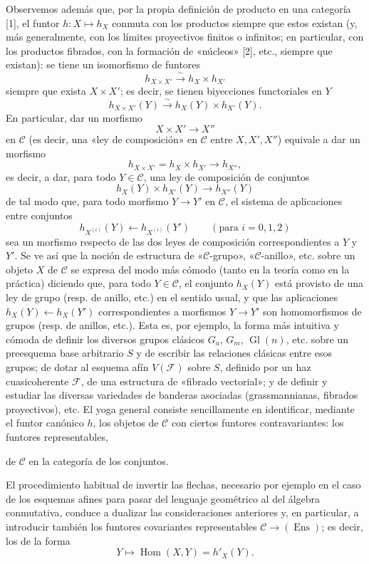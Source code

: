 \documentclass[11pt,twoside,openany]{book}
\numberwithin{equation}{section}
\newcommand{\src}[1]{%
  \phantomsection\hypertarget{src:#1}{}%
  \marginpar{\raggedleft\footnotesize\sffamily #1}%
}
\theoremstyle{plain}
\theoremstyle{definition}
\theoremstyle{remark}
\newcommand{\FgaUnitKey}{frontmatter}
\renewcommand{\src}[1]{%
  \phantomsection\hypertarget{src:\FgaUnitKey:#1}{}%
  \marginpar{\raggedleft\footnotesize\sffamily #1}%
}
\theoremstyle{plain}
\theoremstyle{definition}
\theoremstyle{remark}
\begin{document}
\src{370}
Observemos además que, por la propia definición de producto en una categoría
[1], el funtor $h:X\longmapsto h_X$ conmuta con los productos siempre que estos
existan (y, más generalmente, con los límites proyectivos finitos o infinitos;
en particular, con los productos fibrados, con la formación de «núcleos» [2],
etc., siempre que existan): se tiene un isomorfismo de funtores
\[
  h_{X\times X'}\xrightarrow{\sim}h_X\times h_{X'}
\]
siempre que exista $X\times X'$; es decir, se tienen biyecciones functoriales
en $Y$
\[
  h_{X\times X'}(Y)\xrightarrow{\sim}h_X(Y)\times h_{X'}(Y).
\]
En particular, dar un morfismo
\[
  X\times X'\longrightarrow X''
\]
en $\mathcal C$ (es decir, una «ley de composición» en $\mathcal C$ entre
$X,X',X''$) equivale a dar un morfismo
\[
  h_{X\times X'}=h_X\times h_{X'}\longrightarrow h_{X''},
\]
es decir, a dar, para todo $Y\in\mathcal C$, una ley de composición de
conjuntos
\[
  h_X(Y)\times h_{X'}(Y)\longrightarrow h_{X''}(Y)
\]
de tal modo que, para todo morfismo $Y\longrightarrow Y'$ en $\mathcal C$, el
sistema de aplicaciones entre conjuntos
\[
  h_{X^{(i)}}(Y)\longleftarrow h_{X^{(i)}}(Y')
  \qquad(\text{para }i=0,1,2)
\]
sea un morfismo respecto de las dos leyes de composición correspondientes a
$Y$ y $Y'$. Se ve así que la noción de estructura de «$\mathcal C$-grupo»,
«$\mathcal C$-anillo», etc. sobre un objeto $X$ de $\mathcal C$ se expresa del
modo más cómodo (tanto en la teoría como en la práctica) diciendo que, para
todo $Y\in\mathcal C$, el conjunto $h_X(Y)$ está provisto de una ley de grupo
(resp. de anillo, etc.) en el sentido usual, y que las aplicaciones
$h_X(Y)\longleftarrow h_X(Y')$ correspondientes a morfismos
$Y\longrightarrow Y'$ son homomorfismos de grupos (resp. de anillos, etc.).
Esta es, por ejemplo, la forma más intuitiva y cómoda de definir los diversos
grupos clásicos $G_a$, $G_m$, $\operatorname{Gl}(n)$, etc. sobre un preesquema
base arbitrario $S$ y de escribir las relaciones clásicas entre esos grupos;
de dotar al esquema afín $V(\mathcal F)$ sobre $S$, definido por un haz
cuasicoherente $\mathcal F$, de una estructura de «fibrado vectorial»; y de
definir y estudiar las diversas variedades de banderas asociadas
(grassmannianas, fibrados proyectivos), etc. El yoga general consiste
sencillamente en identificar, mediante el funtor canónico $h$, los objetos de
$\mathcal C$ con ciertos funtores contravariantes: los funtores representables,

\src{371}
de $\mathcal C$ en la categoría de los conjuntos.

El procedimiento habitual de invertir las flechas, necesario por ejemplo en el
caso de los esquemas afines para pasar del lenguaje geométrico al del álgebra
conmutativa, conduce a dualizar las consideraciones anteriores y, en
particular, a introducir también los funtores covariantes representables
$\mathcal C\longrightarrow(\operatorname{Ens})$; es decir, los de la forma
\[
  Y\longmapsto\operatorname{Hom}(X,Y)=h'_X(Y).
\]
\end{document}

